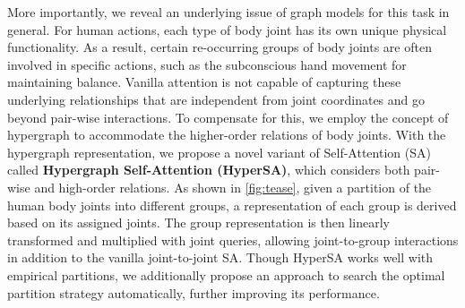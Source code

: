 \documentclass[10pt,twocolumn,letterpaper]{article}
\begin{document}
More importantly, we reveal an underlying issue of graph models for this task in general.
For human actions, each type of body joint has its own unique physical functionality. As a result, certain re-occurring groups of body joints are often involved in specific actions, such as the subconscious hand movement for maintaining balance. 
Vanilla attention is not capable of capturing these underlying relationships that are independent from joint coordinates and go beyond pair-wise interactions. 
To compensate for this, we employ the concept of hypergraph \cite{zhou2006learning, feng2019hypergraph, bai2021hypergraph} to accommodate the higher-order relations of body joints. With the hypergraph representation, we propose a novel variant of Self-Attention (SA) called \textbf{Hypergraph Self-Attention (HyperSA)}, which considers both pair-wise and high-order relations. As shown in \cref{fig:tease}, given a partition of the human body joints into different groups, a representation of each group is derived based on its assigned joints. The group representation is then linearly transformed and multiplied with joint queries, allowing joint-to-group interactions in addition to the vanilla joint-to-joint SA. 
Though HyperSA works well with empirical partitions, we additionally propose an approach to search the optimal partition strategy automatically, further improving its performance.




\end{document}
